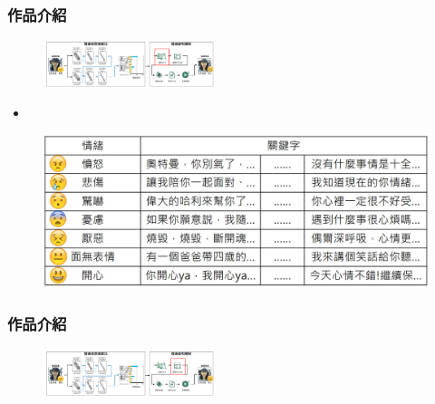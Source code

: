 \documentclass[10pt, conference, compsocconf]{beamer}
\begin{document}
\begin{CJK}{UTF8}{}
\begin{frame}
\frametitle{作品介紹}

\vspace{-5mm}
\begin{figure}[t]
\begin{flushright}
\includegraphics[width=5cm]{./Figures/framework4.pdf}
\end{flushright}
\end{figure}

\vspace{-5mm}

\begin{itemize}
\item {}
\end{itemize}

\begin{figure}[!t]
\begin{center}
\includegraphics[width=12cm]{./Figures/505.jpg}
\end{center}
\end{figure}
\end{frame}

\begin{frame}
\frametitle{作品介紹}

\vspace{-5mm}
\begin{figure}[t]
\begin{flushright}
\includegraphics[width=5cm]{./Figures/framework5.pdf}
\end{flushright}
\end{figure}

\vspace{-5mm}


\end{frame}
\end{CJK}
\end{document}
